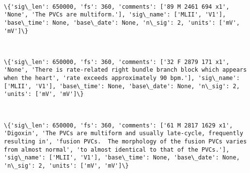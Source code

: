 \documentclass[11pt]{article}
\begin{document}
    \begin{center}
    \end{center}
    { \hspace*{\fill} \\}
    
    \begin{Verbatim}[commandchars=\\\{\}]
\{'sig\_len': 650000, 'fs': 360, 'comments': ['89 M 2461 694 x1', 'None', 'The PVCs are multiform.'], 'sig\_name': ['MLII', 'V1'], 'base\_time': None, 'base\_date': None, 'n\_sig': 2, 'units': ['mV', 'mV']\}

    \end{Verbatim}

    \begin{center}
    \end{center}
    { \hspace*{\fill} \\}
    
    \begin{Verbatim}[commandchars=\\\{\}]
\{'sig\_len': 650000, 'fs': 360, 'comments': ['32 F 2879 171 x1', 'None', 'There is rate-related right bundle branch block which appears when the heart', 'rate exceeds approximately 90 bpm.'], 'sig\_name': ['MLII', 'V1'], 'base\_time': None, 'base\_date': None, 'n\_sig': 2, 'units': ['mV', 'mV']\}

    \end{Verbatim}

    \begin{center}
    \end{center}
    { \hspace*{\fill} \\}
    
    \begin{Verbatim}[commandchars=\\\{\}]
\{'sig\_len': 650000, 'fs': 360, 'comments': ['61 M 2817 1629 x1', 'Digoxin', 'The PVCs are multiform and usually late-cycle, frequently resulting in', 'fusion PVCs.  The morphology of the fusion PVCs varies from almost normal', 'to almost identical to that of the PVCs.'], 'sig\_name': ['MLII', 'V1'], 'base\_time': None, 'base\_date': None, 'n\_sig': 2, 'units': ['mV', 'mV']\}

    \end{Verbatim}
\end{document}
